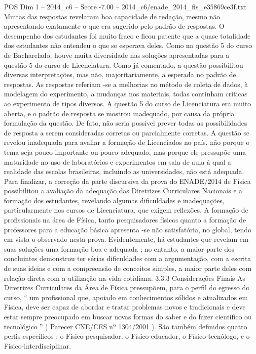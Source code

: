 \begin{textsample}{POS Dim 1 – 2014\_c6 – Score -7.00 – 2014\_c6/enade\_2014\_fis\_e35869ce3f.txt}
Muitas das respostas revelaram boa capacidade de redação, mesmo não apresentando exatamente o que era sugerido pelo padrão de respostas.
O desempenho dos estudantes foi muito fraco e ficou patente que a quase totalidade dos estudantes não entendeu o que se esperava deles.
Como na questão 5 do curso de Bacharelado, houve muita diversidade nas soluções apresentadas para a questão 5 do curso de Licenciatura.
Como já comentado, a questão possibilitou diversas interpretações, mas não, majoritariamente, a esperada no padrão de respostas.
As respostas referiam -se a melhorias no método de coleta de dados, à modelagem do experimento, a mudanças nos materiais, todas continham críticas ao experimento de tipos diversos.
A questão 5 do curso de Licenciatura era muito aberta, e o padrão de resposta se mostrou inadequado, por causa da própria formulação da questão.
De fato, não seria possível prever todas as possibilidades de resposta a serem consideradas corretas ou parcialmente corretas.
A questão se revelou inadequada para avaliar a formação de Licenciados no país, não porque o tema seja pouco importante ou pouco adequado, mas porque ele pressupõe uma maturidade no uso de laboratórios e experimentos em sala de aula à qual a realidade das escolas brasileiras, incluindo as universidades, não está adequada.
Para finalizar, a correção da parte discursiva da prova do ENADE/2014 de Física possibilitou a avaliação da adequação das Diretrizes Curriculares Nacionais e a formação dos estudantes, revelando algumas dificuldades e inadequações, particularmente nos cursos de Licenciatura, que exigem reflexões.
A formação de profissionais na área de Física, tanto pesquisadores físicos quanto a formação de professores para a educação básica apresenta -se não satisfatória, no global, tendo em vista o observado nesta prova.
Evidentemente, há estudantes que revelam em suas soluções uma formação boa e adequada ; no entanto, a maior parte dos concluintes demonstrou ter sérias dificuldades com a argumentação, com a escrita de suas ideias e com a compreensão de conceitos simples, a maior parte deles com relação direta com a utilização na vida cotidiana. 3.3.3 Considerações Finais As Diretrizes Curriculares da Área de Física pressupõem, para o perfil do egresso do curso, “ um profissional que, apoiado em conhecimentos sólidos e atualizados em Física, deve ser capaz de abordar e tratar problemas novos e tradicionais e deve estar sempre preocupado em buscar novas formas do saber e do fazer científico ou tecnológico ” ( Parecer CNE/CES nº 1304/2001 ).
São também definidos quatro perfis específicos : o Físico-pesquisador, o Físico-educador, o Físico-tecnólogo, e o Físico-interdisciplinar.

\end{textsample}
